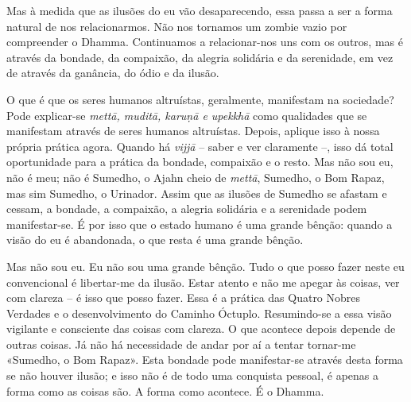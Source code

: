 Mas à medida que as ilusões do eu vão desaparecendo, essa passa a ser a forma
natural de nos relacionarmos. Não nos tornamos um zombie vazio por compreender o
Dhamma. Continuamos a relacionar-nos uns com os outros, mas é através da
bondade, da compaixão, da alegria solidária e da serenidade, em vez de através
da ganância, do ódio e da ilusão.

O que é que os seres humanos altruístas, geralmente, manifestam na sociedade?
Pode explicar-se \emph{mettā, muditā, karuṇā e upekkhā} como qualidades que se
manifestam através de seres humanos altruístas. Depois, aplique isso à nossa
própria prática agora. Quando há \emph{vijjā} -- saber e ver claramente --, isso
dá total oportunidade para a prática da bondade, compaixão e o resto. Mas não
sou eu, não é meu; não é Sumedho, o Ajahn cheio de \emph{mettā}, Sumedho, o Bom Rapaz,
mas sim Sumedho, o Urinador. Assim que as ilusões de Sumedho se afastam e
cessam, a bondade, a compaixão, a alegria solidária e a serenidade podem
manifestar-se. É por isso que o estado humano é uma grande bênção: quando a
visão do eu é abandonada, o que resta é uma grande bênção.

Mas não sou eu. Eu não sou uma grande bênção. Tudo o que posso fazer neste eu
convencional é libertar-me da ilusão. Estar atento e não me apegar às coisas,
ver com clareza -- é isso que posso fazer. Essa é a prática das Quatro Nobres
Verdades e o desenvolvimento do Caminho Óctuplo. Resumindo-se a essa visão
vigilante e consciente das coisas com clareza. O que acontece depois depende de
outras coisas. Já não há necessidade de andar por aí a tentar tornar-me
«Sumedho, o Bom Rapaz». Esta bondade pode manifestar-se através desta forma se
não houver ilusão; e isso não é de todo uma conquista pessoal, é apenas a forma
como as coisas são. A forma como acontece. É o Dhamma.



